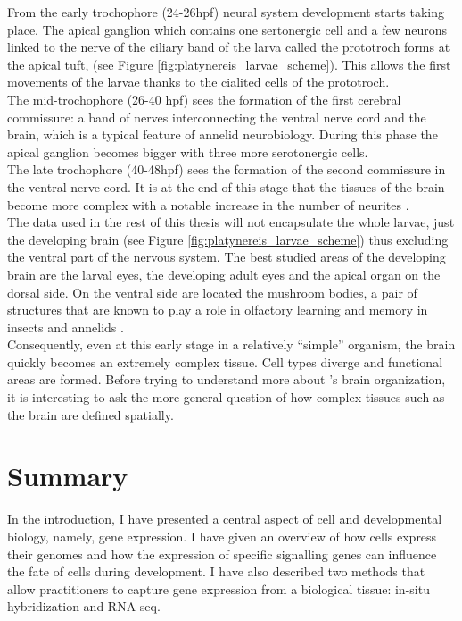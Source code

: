      From the early trochophore (24-26hpf) neural system development starts taking place. The apical ganglion which contains one sertonergic cell and a few neurons linked to the nerve of the ciliary band of the larva called the prototroch forms at the apical tuft, (see Figure \ref{fig:platynereis_larvae_scheme}). This allows the first movements of the larvae thanks to the cialited cells of the prototroch.\\
     
     The mid-trochophore (26-40 hpf) sees the formation of the first cerebral commissure: a band of nerves interconnecting the ventral nerve cord and the brain, which is a typical feature of annelid neurobiology. During this phase the apical ganglion becomes bigger with three more serotonergic cells.\\
     
     The late trochophore (40-48hpf) sees the formation of the second commissure in the ventral nerve cord. It is at the end of this stage that the tissues of the brain become more complex with a notable increase in the number of neurites \citep{Fischer10}.\\
     
     The data used in the rest of this thesis will not encapsulate the whole larvae, just the developing brain (see Figure \ref{fig:platynereis_larvae_scheme}) thus excluding the ventral part of the nervous system. The best studied areas of the developing brain are the larval eyes, the developing adult eyes and the apical organ on the dorsal side. On the ventral side are located the mushroom bodies, a pair of structures that are known to play a role in olfactory learning and memory in insects and annelids \citep{Tomer10}.\\
     
     Consequently, even at this early stage in a relatively ``simple'' organism, the brain quickly becomes an extremely complex tissue. Cell types diverge and functional areas are formed. Before trying to understand more about \platy{}'s brain organization, it is interesting to ask the more general question of how complex tissues such as the brain are defined spatially.


    
\section{Summary}
     
     

	In the introduction, I have presented a central aspect of cell and developmental biology, namely, gene expression. I have given an overview of how cells express their genomes and how the expression of specific signalling genes can influence the fate of cells during development. I have also described two methods that allow practitioners to capture gene expression from a biological tissue: in-situ hybridization and RNA-seq.\\
	
